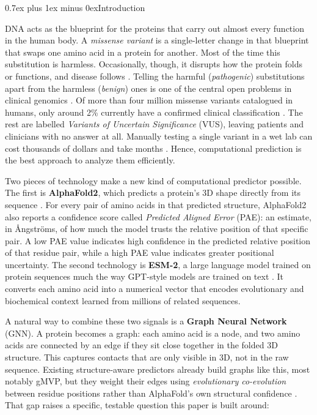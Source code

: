 \documentclass[10pt,conference,a4paper]{IEEEtran}
\makeatletter
\def\section{\@startsection{section}{1}{\z@}{1.5ex plus 1.5ex minus 0.5ex}%
{0.7ex plus 1ex minus 0ex}{\normalfont\normalsize\bfseries\centering}}%
\makeatother
\begin{document}
\section{Introduction}

DNA acts as the blueprint for the proteins that carry out almost every function in the human body. A \textit{missense variant} is a single-letter change in that blueprint that swaps one amino acid in a protein for another. Most of the time this substitution is harmless. Occasionally, though, it disrupts how the protein folds or functions, and disease follows \cite{zhang2012missense}. Telling the harmful (\textit{pathogenic}) substitutions apart from the harmless (\textit{benign}) ones is one of the central open problems in clinical genomics \cite{ciesielski2024context}. Of more than four million missense variants catalogued in humans, only around 2\% currently have a confirmed clinical classification \cite{cheng2023alphamissense}. The rest are labelled \textit{Variants of Uncertain Significance} (VUS), leaving patients and clinicians with no answer at all. Manually testing a single variant in a wet lab can cost thousands of dollars and take months \cite{santosgonzalez2024cost}. Hence, computational prediction is the best approach to analyze them efficiently.

Two pieces of technology make a new kind of computational predictor possible. The first is \textbf{AlphaFold2}, which predicts a protein's 3D shape directly from its sequence \cite{jumper2021alphafold}. For every pair of amino acids in that predicted structure, AlphaFold2 also reports a confidence score called \textit{Predicted Aligned Error} (PAE): an estimate, in \r{A}ngstr\"{o}ms, of how much the model trusts the relative position of that specific pair. A low PAE value indicates high confidence in the predicted relative position of that residue pair, while a high PAE value indicates greater positional uncertainty. The second technology is \textbf{ESM-2}, a large language model trained on protein sequences much the way GPT-style models are trained on text \cite{lin2023esm2}. It converts each amino acid into a numerical vector that encodes evolutionary and biochemical context learned from millions of related sequences.

A natural way to combine these two signals is a \textbf{Graph Neural Network} (GNN). A protein becomes a graph: each amino acid is a node, and two amino acids are connected by an edge if they sit close together in the folded 3D structure. This captures contacts that are only visible in 3D, not in the raw sequence. Existing structure-aware predictors already build graphs like this, most notably gMVP, but they weight their edges using \textit{evolutionary co-evolution} between residue positions rather than AlphaFold's own structural confidence \cite{zhang2022gmvp}. That gap raises a specific, testable question this paper is built around:
\end{document}
